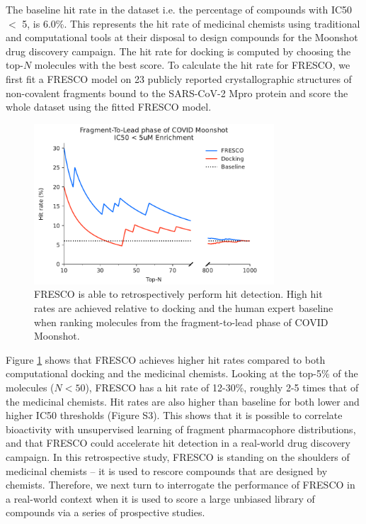 The baseline hit rate in the dataset i.e. the percentage of compounds with IC50 $<$ 5\uM, is 6.0\%. This represents the hit rate of medicinal chemists using traditional and computational tools at their disposal to design compounds for the Moonshot drug discovery campaign. The hit rate for docking is computed by choosing the top-$N$ molecules with the best score. To calculate the hit rate for FRESCO, we first fit a FRESCO model on 23 publicly reported crystallographic structures of non-covalent fragments bound to the SARS-CoV-2 Mpro protein \cite{Douangamath2020XChem} and score the whole dataset using the fitted FRESCO model.

\begin{figure}[th]
    \centering
    \includegraphics[width=0.8\textwidth]{Chapters/Fresco/Figs/fresco_vs_moonshot_break_5uM.pdf}
    \caption{FRESCO is able to retrospectively perform hit detection. High hit rates are achieved relative to docking and the human expert baseline when ranking molecules from the fragment-to-lead phase of COVID Moonshot.}
    \label{fig:moonshot_enrichment_vs_docking}
\end{figure}

Figure \ref{fig:moonshot_enrichment_vs_docking} shows that FRESCO achieves higher hit rates compared to both computational docking and the medicinal chemists. Looking at the top-5\% of the molecules ($N<50$), FRESCO has a hit rate of 12-30\%, roughly 2-5 times that of the medicinal chemists. Hit rates are also higher than baseline for both lower and higher IC50 thresholds (Figure S3). This shows that it is possible to correlate bioactivity with unsupervised learning of fragment pharmacophore distributions, and that FRESCO could accelerate hit detection in a real-world drug discovery campaign. In this retrospective study, FRESCO is standing on the shoulders of medicinal chemists -- it is used to rescore compounds that are designed by chemists. Therefore, we next turn to interrogate the performance of FRESCO in a real-world context when it is used to score a large unbiased library of compounds via a series of prospective studies. 


